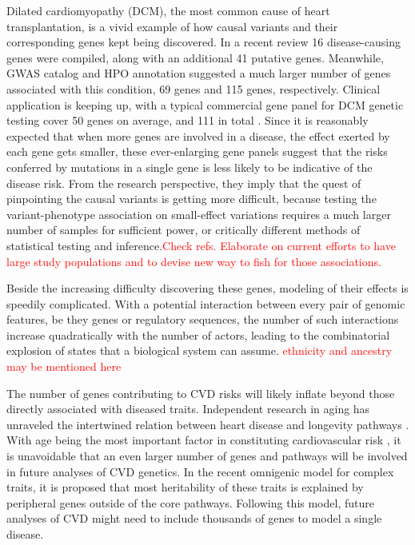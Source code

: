 \documentclass[letter]{bioinfo}
\newcommand{\comment}[1]{\textcolor{red}{#1}}
\begin{document}
Dilated cardiomyopathy (DCM), the most common cause of heart transplantation, is a vivid example of how causal variants and their corresponding genes kept being discovered. In a recent review \citep{Burke:2016:Clinical} 16 disease-causing genes were compiled, along with an additional 41 putative genes. Meanwhile, GWAS catalog and HPO annotation suggested a much larger number of genes associated with this condition, 69 genes and 115 genes, respectively. Clinical application is keeping up, with a typical commercial gene panel for DCM genetic testing cover 50 genes on average, and 111 in total \citep{McNally:2017:Dilated}.
Since it is reasonably expected that when more genes are involved in a disease, the effect exerted by each gene gets smaller, these ever-enlarging gene panels suggest that the risks conferred by mutations in a single gene is less likely to be indicative of the disease risk.
From the research perspective, they imply that the quest of pinpointing the causal variants is getting more difficult, because testing the variant-phenotype association on small-effect variations requires a much larger number of samples for sufficient power, or critically different methods of statistical testing and inference.\comment{Check refs. Elaborate on current efforts to have large study populations and to devise new way to fish for those associations.}

Beside the increasing difficulty discovering these genes, modeling of their effects is speedily complicated. With a potential interaction between every pair of genomic features, be they genes or regulatory sequences, the number of such interactions increase quadratically with the number of actors, leading to the combinatorial explosion of states that a biological system can assume. \comment{ethnicity and ancestry may be mentioned here}

The number of genes contributing to CVD risks will likely inflate beyond those directly associated with diseased traits. Independent research in aging has unraveled the intertwined relation between heart disease and longevity pathways \citep{North:2012:Intersection}.  With age being the most important factor in constituting cardiovascular risk \citep{Steenman:2017:Cardiac}, it is unavoidable that an even larger number of genes and pathways will be involved in future analyses of CVD genetics. In the recent omnigenic model for complex traits, it is proposed that most heritability of these traits is explained by peripheral genes outside of the core pathways. Following this model, future analyses of CVD might need to include thousands of genes to model a single disease.
\end{document}
